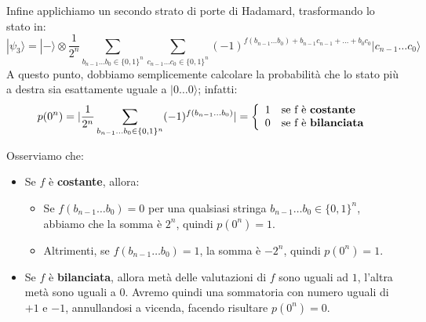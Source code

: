 Infine applichiamo un secondo strato di porte di Hadamard, trasformando lo stato in:
\begin{equation*}
   |\psi_3\rangle = |-\rangle \otimes \frac{1}{2^n} \sum_{b_{n-1}\hdots b_0 \in \{0,1\}^n} \sum_{c_{n-1}\hdots c_0 \in \{0,1\}^n} (-1)^{f(b_{n-1} \hdots b_0) + b_{n-1}c_{n-1} + \hdots + b_0c_0}|c_{n-1} \hdots c_0\rangle
\end{equation*}
A questo punto, dobbiamo semplicemente calcolare la probabilità che lo stato più a destra
sia esattamente uguale a $|0 \hdots 0\rangle$; infatti:
\begin{equation*}
    p(0^n) = \vert \frac{1}{2^n} \sum_{b_{n-1} \hdots b_0 \in \{0,1\}^n} (-1)^{f(b_{n-1} \hdots b_0)} \vert =
    \left\{ \begin{array}{l l}
        1 & \text{se f è }\textbf{costante} \\
        0 & \text{se f è }\textbf{bilanciata}  
    \end{array}\right.
\end{equation*}
\begin{oss}{}{}
    Osserviamo che:
    \begin{itemize}
        \item Se $f$ è \textbf{costante}, allora:
            \begin{itemize}
                \item Se $f(b_{n-1} \hdots b_0) = 0$ per una qualsiasi stringa $b_{n-1} \hdots b_0 \in \{0,1\}^n$, abbiamo che la somma è $2^n$, quindi $p(0^n) = 1$.
                \item Altrimenti, se $f(b_{n-1} \hdots b_0) = 1$, la somma è $-2^n$, quindi $p(0^n) = 1$.
            \end{itemize}
        \item Se $f$ è \textbf{bilanciata}, allora metà delle valutazioni di $f$ sono uguali ad $1$, l'altra metà sono uguali a $0$. Avremo quindi una sommatoria con numero uguali di $+1$ e $-1$, annullandosi a vicenda, facendo risultare $p(0^n) = 0$.
    \end{itemize}
\end{oss}